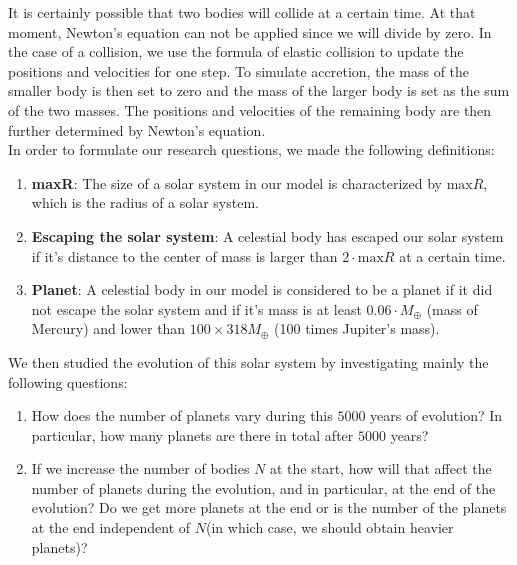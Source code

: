 It is certainly possible that two bodies will collide at a certain time. 
At that moment, Newton's equation can not be applied since we will divide by zero. 
In the case of a collision, we use the formula of elastic collision to update the positions and velocities for one step. 
To simulate accretion, the mass of the smaller body is then set to zero and the mass of the larger body is set as the sum of the two masses. 
The positions and velocities of the remaining body are then further determined by Newton's equation.\\

In order to formulate our research questions, we made the following definitions:\\
\begin{enumerate}
\item \textbf{maxR}: The size of a solar system in our model is characterized by $\text{max}R$, which is the radius of a solar system. 
\item \textbf{Escaping the solar system}: A celestial body has escaped our solar system if it's distance to the center of mass is larger than $2\cdot\text{max}R$ at a certain time.
\item \textbf{Planet}: A celestial body in our model is considered to be a planet if it did not escape the solar system and if it's mass is at least $0.06\cdot M_{\oplus}$ (mass of Mercury) and lower than $100\times 318M_{\oplus}$ (100 times Jupiter's mass).
\end{enumerate}
We then studied the evolution of this solar system by investigating mainly the following questions:
\begin{enumerate}
	\item  How does the number of planets vary during this $5000$ years of evolution? In particular, how many planets are there in total after $5000$ years?
	
	\item  If we increase the number of bodies $N$ at the start, how will that affect the number of planets during the evolution, and in particular, at the end of the evolution? Do we get more planets at the end or is the number of the planets at the end independent of $N$(in which case, we should obtain heavier planets)?   


\end{enumerate}
 